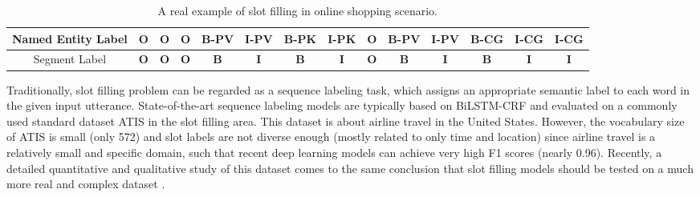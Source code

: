 \begin{table}[h]
\begin{tabular}{c|c|c|c|c|c|c|c|c|c|c|c|c|c}
		\midrule
		Named Entity Label & \textbf{O} & \textbf{O} & \textbf{O} & \textbf{B-PV} & \textbf{I-PV} & \textbf{B-PK} & \textbf{I-PK} & \textbf{O} & \textbf{B-PV} & \textbf{I-PV} & \textbf{B-CG} & \textbf{I-CG} & \textbf{I-CG} \\
		\midrule
		Segment Label & \textbf{O} & \textbf{O} & \textbf{O} & \textbf{B} & \textbf{I} & \textbf{B} & \textbf{I} & \textbf{O} & \textbf{B} & \textbf{I} & \textbf{B} & \textbf{I} & \textbf{I} \\
		\bottomrule
	\end{tabular}
	\caption{A real example of slot filling in online shopping scenario.}
	\label{tab:slot-filling-demo}
\end{table}

Traditionally, slot filling problem  can be regarded as a sequence 
labeling task,
which assigns an appropriate semantic label to each word in
the given input utterance.
State-of-the-art sequence labeling models are typically based on 
BiLSTM-CRF \cite{huang2015bidirectional,reimers2017optimal}
and evaluated on a commonly used standard dataset ATIS \cite{price1990evaluation} in the slot filling area.
This dataset is about airline travel in the United States.
However, the vocabulary size of ATIS is small (only 572)
and slot labels are not diverse enough (mostly related to only time and location)
since airline travel is a relatively small and specific domain,
such that recent deep learning models can achieve very high F1 scores
(nearly 0.96). Recently, a detailed quantitative and qualitative study of this dataset comes to the same conclusion that slot filling models should be tested on a much more real and complex dataset \cite{bechet2018atis}. 

